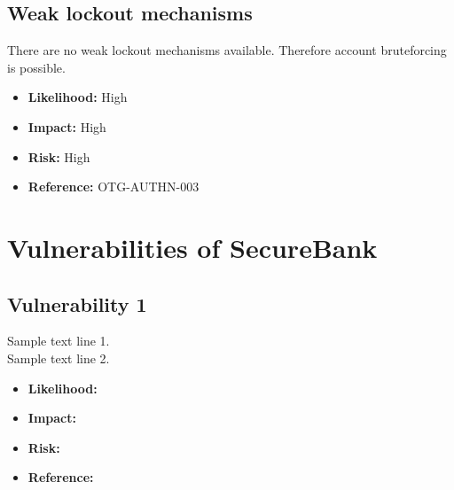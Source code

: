 \subsection{Weak lockout mechanisms}
There are no weak lockout mechanisms available. Therefore account bruteforcing is possible.
\begin{itemize}
	\item \textbf{Likelihood:} High
	\item \textbf{Impact:} High
	\item \textbf{Risk:} High
	\item \textbf{Reference:} OTG-AUTHN-003
\end{itemize}

\section{Vulnerabilities of SecureBank}

\subsection{Vulnerability 1}
Sample text line 1.\\
Sample text line 2.\\
\begin{itemize}
	\item \textbf{Likelihood:}
	\item \textbf{Impact:}
	\item \textbf{Risk:}
	\item \textbf{Reference:}
\end{itemize}